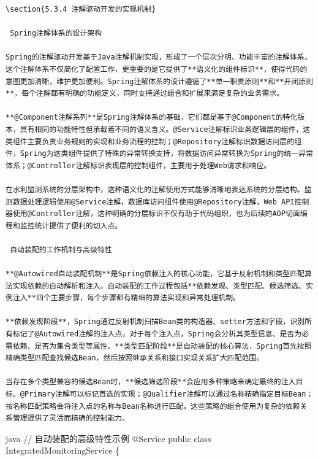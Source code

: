 \begin{lstlisting}
\section{5.3.4 注解驱动开发的实现机制}

 Spring注解体系的设计架构

Spring的注解驱动开发基于Java注解机制实现，形成了一个层次分明、功能丰富的注解体系。这个注解体系不仅简化了配置工作，更重要的是它提供了**语义化的组件标识**，使得代码的意图更加清晰，维护更加便利。Spring注解体系的设计遵循了**单一职责原则**和**开闭原则**，每个注解都有明确的功能定义，同时支持通过组合和扩展来满足复杂的业务需求。

**@Component注解系列**是Spring注解体系的基础，它们都是基于@Component的特化版本，具有相同的功能特性但承载着不同的语义含义。@Service注解标识业务逻辑层的组件，这类组件主要负责业务规则的实现和业务流程的控制；@Repository注解标识数据访问层的组件，Spring为这类组件提供了特殊的异常转换支持，将数据访问异常转换为Spring的统一异常体系；@Controller注解标识表现层的控制组件，主要用于处理Web请求和响应。

在水利监测系统的分层架构中，这种语义化的注解使用方式能够清晰地表达系统的分层结构。监测数据处理逻辑使用@Service注解，数据库访问组件使用@Repository注解，Web API控制器使用@Controller注解，这种明确的分层标识不仅有助于代码组织，也为后续的AOP切面编程和监控统计提供了便利的切入点。

 自动装配的工作机制与高级特性

**@Autowired自动装配机制**是Spring依赖注入的核心功能，它基于反射机制和类型匹配算法实现依赖的自动解析和注入。自动装配的工作过程包括**依赖发现、类型匹配、候选筛选、实例注入**四个主要步骤，每个步骤都有精细的算法实现和异常处理机制。

**依赖发现阶段**，Spring通过反射机制扫描Bean类的构造器、setter方法和字段，识别所有标记了@Autowired注解的注入点。对于每个注入点，Spring会分析其类型信息、是否为必需依赖、是否为集合类型等属性。**类型匹配阶段**是自动装配的核心算法，Spring首先按照精确类型匹配查找候选Bean，然后按照继承关系和接口实现关系扩大匹配范围。

当存在多个类型兼容的候选Bean时，**候选筛选阶段**会应用多种策略来确定最终的注入目标。@Primary注解可以标记首选的实现；@Qualifier注解可以通过名称精确指定目标Bean；按名称匹配策略会将注入点的名称与Bean名称进行匹配。这些策略的组合使用为复杂的依赖关系管理提供了灵活而精确的控制能力。
\end{lstlisting}

java // 自动装配的高级特性示例 @Service public class IntegratedMonitoringService \{

